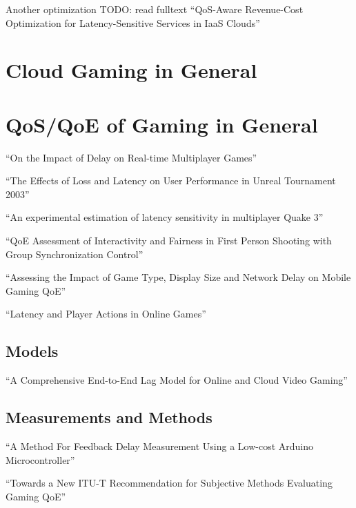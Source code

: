 Another optimization TODO: read fulltext
``QoS-Aware Revenue-Cost Optimization for Latency-Sensitive Services in IaaS Clouds'' \cite{6365107}

\section{Cloud Gaming in General}


\section{QoS/QoE of Gaming in General}

``On the Impact of Delay on Real-time Multiplayer Games'' \cite{Pantel:2002:IDR:507670.507674}

``The Effects of Loss and Latency on User Performance in Unreal Tournament 2003'' \cite{Beigbeder:2004:ELL:1016540.1016556}

``An experimental estimation of latency sensitivity in multiplayer Quake 3'' \cite{1266180}

``QoE Assessment of Interactivity and Fairness in First Person Shooting with Group Synchronization Control'' \cite{Ida:2010:QAI:1944796.1944806}

``Assessing the Impact of Game Type, Display Size and Network Delay on Mobile Gaming QoE'' \cite{beyer2014typedisplaydelayimpact}

``Latency and Player Actions in Online Games'' \cite{Claypool:2006:LPA:1167838.1167860}

\subsection{Models}
``A Comprehensive End-to-End Lag Model for Online and Cloud Video Gaming'' \cite{metzger16lagmodel}


\subsection{Measurements and Methods}

``A Method For Feedback Delay Measurement Using a Low-cost Arduino Microcontroller'' \cite{beyermethod}

``Towards a New {ITU-T} Recommendation for Subjective Methods Evaluating Gaming {QoE}'' \cite{mollertowards}

